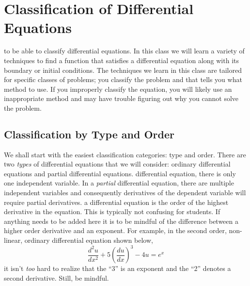 \section{Classification of Differential Equations}
 to be able to classify differential equations.  In this class we will learn a variety of techniques to find a function that satisfies a differential equation along with its boundary or initial conditions. The techniques we learn in this class are tailored for specific classes of problems; you classify the problem and that tells you what method to use.  If you improperly classify the equation, you will likely use an inappropriate method and may have trouble figuring out why you cannot solve the problem.  
\subsection{Classification by Type and Order}
We shall start with the easiest classification categories: type and order.  There are two \emph{types} of differential equations that we will consider: ordinary differential equations and partial differential equations.  
 differential equation, there is only one independent variable.  In a \emph{partial} differential equation, there are multiple independent variables and consequently derivatives of the dependent variable will require partial derivatives.
 a differential equation is the order of the highest derivative in the equation.  This is typically not confusing for students. If anything needs to be added here it is to be mindful of the difference between a higher order derivative and an exponent.  For example, in the second order, non-linear, ordinary differential equation shown below, 
$$ \frac{d^2u}{dx^2}+5\left(\frac{du}{dx} \right)^3 - 4u = e^{x}  $$
it isn't \emph{too} hard to realize that the ``3'' is an exponent and the ``2'' denotes a second derivative. Still, be mindful.   

